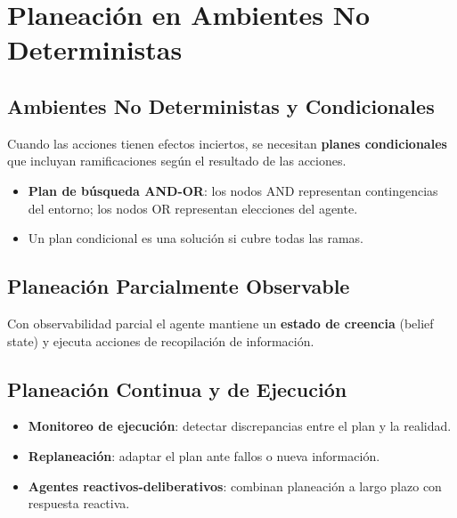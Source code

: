 \section{Planeación en Ambientes No Deterministas}

\subsection{Ambientes No Deterministas y Condicionales}

Cuando las acciones tienen efectos inciertos, se necesitan \textbf{planes condicionales} que incluyan ramificaciones según el resultado de las acciones.

\begin{itemize}
    \item \textbf{Plan de búsqueda AND-OR}: los nodos AND representan contingencias del entorno; los nodos OR representan elecciones del agente.
    \item Un plan condicional es una solución si cubre todas las ramas.
\end{itemize}

\subsection{Planeación Parcialmente Observable}

Con observabilidad parcial el agente mantiene un \textbf{estado de creencia} (belief state) y ejecuta acciones de recopilación de información.

\subsection{Planeación Continua y de Ejecución}

\begin{itemize}
    \item \textbf{Monitoreo de ejecución}: detectar discrepancias entre el plan y la realidad.
    \item \textbf{Replaneación}: adaptar el plan ante fallos o nueva información.
    \item \textbf{Agentes reactivos-deliberativos}: combinan planeación a largo plazo con respuesta reactiva.
\end{itemize}


